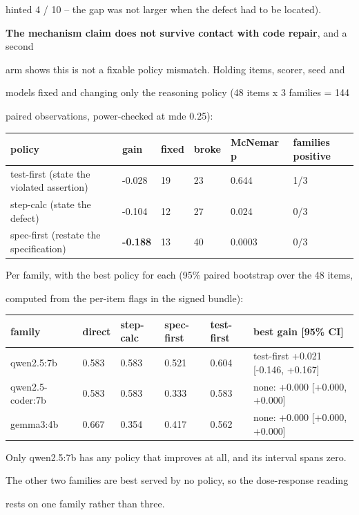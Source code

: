 \documentclass[11pt]{article}
\begin{document}
hinted 4 / 10 -- the gap was not larger when the defect had to be located).


{\bf The mechanism claim does not survive contact with code repair}, and a second

arm shows this is not a fixable policy mismatch. Holding items, scorer, seed and

models fixed and changing only the reasoning policy (48 items x 3 families = 144

paired observations, power-checked at mde 0.25):


\begin{center}\small\begin{tabular}{llllll}\hline
policy & gain & fixed & broke & McNemar p & families positive \\
\hline
test-first (state the violated assertion) & -0.028 & 19 & 23 & 0.644 & 1/3 \\
step-calc (state the defect) & -0.104 & 12 & 27 & 0.024 & 0/3 \\
spec-first (restate the specification) & {\bf -0.188} & 13 & 40 & 0.0003 & 0/3 \\
\end{tabular}\end{center}

Per family, with the best policy for each (95\% paired bootstrap over the 48 items,

computed from the per-item flags in the signed bundle):


\begin{center}\small\begin{tabular}{llllll}\hline
family & direct & step-calc & spec-first & test-first & best gain [95\% CI] \\
\hline
qwen2.5:7b & 0.583 & 0.583 & 0.521 & 0.604 & test-first +0.021 [-0.146, +0.167] \\
qwen2.5-coder:7b & 0.583 & 0.583 & 0.333 & 0.583 & none: +0.000 [+0.000, +0.000] \\
gemma3:4b & 0.667 & 0.354 & 0.417 & 0.562 & none: +0.000 [+0.000, +0.000] \\
\end{tabular}\end{center}

Only qwen2.5:7b has any policy that improves at all, and its interval spans zero.

The other two families are best served by no policy, so the dose-response reading

rests on one family rather than three.
\end{document}
